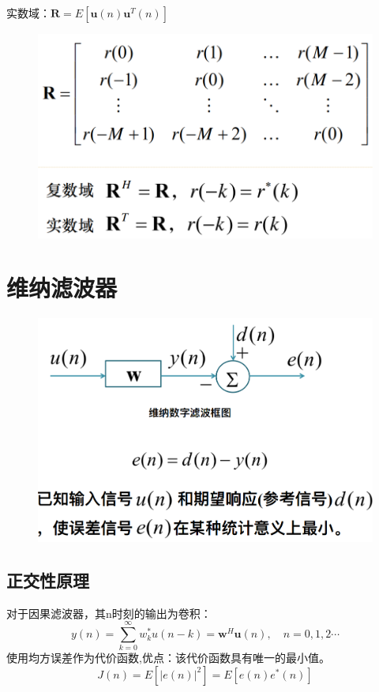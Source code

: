 \documentclass[UTF8]{ctexart} %
\begin{document}
				实数域：$\textbf{R}=E[\textbf{u}(n)\textbf{u}^T(n)]$
				
				\begin{figure}[H]
					\centering\includegraphics[scale=0.3]{8.png}
				\end{figure}
	\section{维纳滤波器}
		\begin{figure}[H]
			\centering\includegraphics[scale=0.3]{9.png}
		\end{figure}
		\subsection{正交性原理}
		
			对于因果滤波器，其n时刻的输出为卷积：
			\[y(n) = \sum_{k=0}^\infty w_k^*u(n-k) = \textbf{w}^H\textbf{u}(n),\quad n=0,1,2\cdots\]
			使用均方误差作为代价函数,优点：该代价函数具有唯⼀的最⼩值。
			\[J(n) = E[|e(n)|^2]=E[e(n)e^*(n)]\] 
			
\end{document}
